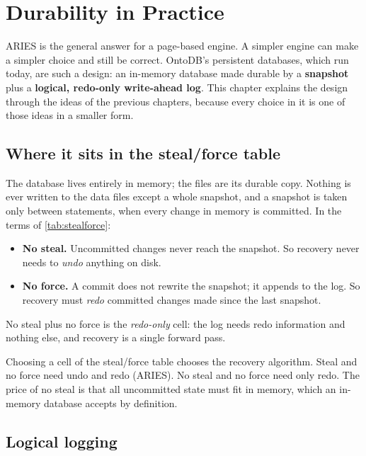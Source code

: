 \chapter{Durability in Practice}
\label{ch:durability}

ARIES is the general answer for a page-based engine. A simpler engine can make a
simpler choice and still be correct. OntoDB's persistent databases, which run
today, are such a design: an in-memory database made durable by a
\textbf{snapshot} plus a \textbf{logical, redo-only write-ahead log}. This
chapter explains the design through the ideas of the previous chapters, because
every choice in it is one of those ideas in a smaller form.

\section{Where it sits in the steal/force table}

The database lives entirely in memory; the files are its durable copy. Nothing
is ever written to the data files except a whole snapshot, and a snapshot is
taken only between statements, when every change in memory is committed. In the
terms of \cref{tab:stealforce}:

\begin{itemize}
\item \textbf{No steal.} Uncommitted changes never reach the snapshot. So recovery never needs to \emph{undo} anything on disk.
\item \textbf{No force.} A commit does not rewrite the snapshot; it appends to the log. So recovery must \emph{redo} committed changes made since the last snapshot.
\end{itemize}

No steal plus no force is the \emph{redo-only} cell: the log needs redo
information and nothing else, and recovery is a single forward pass.

\begin{keyidea}
Choosing a cell of the steal/force table chooses the recovery algorithm. Steal
and no force need undo and redo (ARIES). No steal and no force need only redo.
The price of no steal is that all uncommitted state must fit in memory, which an
in-memory database accepts by definition.
\end{keyidea}

\section{Logical logging}

